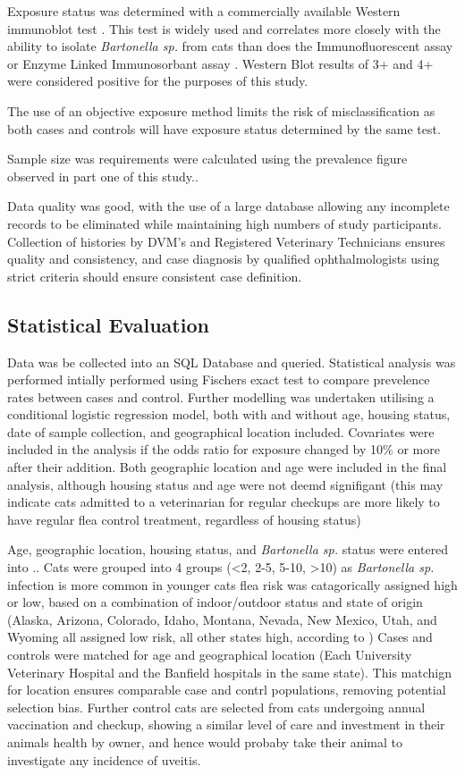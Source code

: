 \documentclass[11pt,twocolumn]{article}
\begin{document}
	Exposure status was determined with a commercially available Western immunoblot test \cite{febart}. This test is widely used and correlates more closely with the ability to isolate \emph{Bartonella sp.} from cats than does the Immunofluorescent assay or Enzyme Linked Immunosorbant assay \cite{Jr1995}. 
	Western Blot results of 3+ and 4+ were considered positive for the purposes of this study. 

	The use of an objective exposure method limits the risk of misclassification as both cases and controls will have exposure status determined by the same test.

	
	Sample size was requirements were calculated using the prevalence figure observed in part one of this study..


	Data quality was good, with the use of a large database allowing any incomplete records to be eliminated while maintaining high numbers of study participants.
	Collection of histories by DVM's and Registered Veterinary Technicians ensures quality and consistency, and case diagnosis by qualified ophthalmologists using strict criteria should ensure consistent case definition.

	\subsection{Statistical Evaluation}
		Data was be collected into an SQL Database and queried. Statistical analysis was performed intially performed using Fischers exact test to compare prevelence rates between cases and control. 
		Further modelling was undertaken utilising a conditional logistic regression model, both with and without age, housing status, date of sample collection, and geographical location included. 
		Covariates were included in the analysis if the odds ratio for exposure changed by 10\% or more after their addition.
		Both geographic location and age were included in the final analysis, although housing status and age were not deemd signifigant (this may indicate cats admitted to a veterinarian for regular checkups are more likely to have regular flea control treatment, regardless of housing status)

		Age, geographic location, housing status, and \emph{Bartonella sp.} status were entered into ..
		Cats were grouped into 4 groups (<2, 2-5, 5-10, >10) as \emph{Bartonella sp.} infection is more common in younger cats
		flea risk was catagorically assigned high or low, based on a combination of indoor/outdoor status and state of origin (Alaska, Arizona, Colorado, Idaho, Montana, Nevada, New Mexico, Utah, and Wyoming all assigned low risk, all other states high, according to \cite{Jameson1995a})
		Cases and controls were matched for age and geographical location (Each University Veterinary Hospital and the Banfield hospitals in the same state).
		This matchign for location ensures comparable case and contrl populations, removing potential selection bias. Further control cats are selected from cats undergoing annual vaccination and checkup, showing a similar level of care and investment in their animals health by owner, and hence would probaby take their animal to investigate any incidence of uveitis. %
\end{document}
